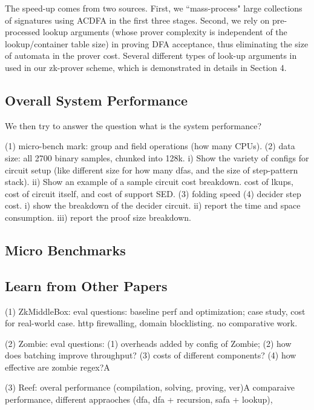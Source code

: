 The speed-up comes from two sources. First, we ``mass-process" large collections
of signatures using ACDFA in the first three stages. Second, we rely on
pre-processed lookup arguments (whose prover complexity is independent
of the lookup/container table size) in proving DFA acceptance, thus eliminating
the size of automata in the prover cost. Several different types of
look-up arguments in used in our zk-prover scheme, which is demonstrated
in details in Section 4.

\subsection{Overall System Performance}
We then try to answer the question what is the system performance?

(1) micro-bench mark: group and field operations (how many CPUs).
(2) data size: all 2700 binary samples, chunked into 128k. 
  i) Show the variety of configs for circuit setup (like different
  	size for how many dfas, and the size of step-pattern stack).
  ii) Show an example of a sample circuit cost breakdown. cost of
  	lkups, cost of circuit itself, and cost of support SED.
(3) folding speed
(4) decider step cost. 
	i) show the breakdown of the decider circuit.
	ii) report the time and space consumption. 
	iii) report the proof size breakdown.


\subsection{Micro Benchmarks}

\subsection{Learn from Other Papers}
(1) ZkMiddleBox: eval questions: baseline perf and optimization; case study,
cost for real-world case. http firewalling, domain blocklisting.
no comparative work.

(2) Zombie: eval questions: (1) overheads added by config of Zombie; (2) 
how does batching improve throughput? (3) costs of different components?
(4) how effective are zombie regex?A

(3) Reef: overal performance (compilation, solving, proving, ver)A
 comparaive performance, different appraoches (dfa, dfa + recursion, safa
 	+ lookup), 

